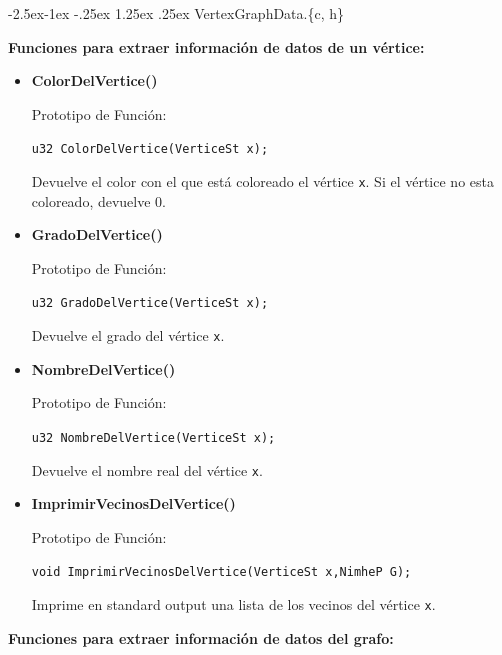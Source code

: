\documentclass[11pt,a4paper]{article}
\makeatletter
\renewcommand\paragraph{\@startsection{paragraph}{4}{\z@}%
            {-2.5ex\@plus -1ex \@minus -.25ex}%
            {1.25ex \@plus .25ex}%
            {\normalfont\normalsize\bfseries}}
\theoremstyle{plain}
\makeatother
\begin{document}
				\paragraph{VertexGraphData.\{c, h\}}

\textbf{Funciones para extraer información de datos de un vértice:}

\begin{itemize}

\item{\textbf{{ColorDelVertice()}}}

Prototipo de Función:

\texttt{u32 ColorDelVertice(VerticeSt x);}

Devuelve el color con el que está coloreado el vértice \texttt{x}. Si el vértice no esta coloreado, devuelve 0.

\item{\textbf{{GradoDelVertice()}}}

Prototipo de Función:

\texttt{u32 GradoDelVertice(VerticeSt x);}

Devuelve el grado del vértice \texttt{x}.

\item{\textbf{{NombreDelVertice()}}}

Prototipo de Función:

\texttt{u32 NombreDelVertice(VerticeSt x);}

Devuelve el nombre real del vértice \texttt{x}.


\item{\textbf{{ImprimirVecinosDelVertice()}}}

Prototipo de Función:

\texttt{void ImprimirVecinosDelVertice(VerticeSt x,NimheP G);}

Imprime en standard output una lista de los vecinos del vértice \texttt{x}.
\end{itemize}

\textbf{Funciones para extraer información de datos del grafo:}
\end{document}
